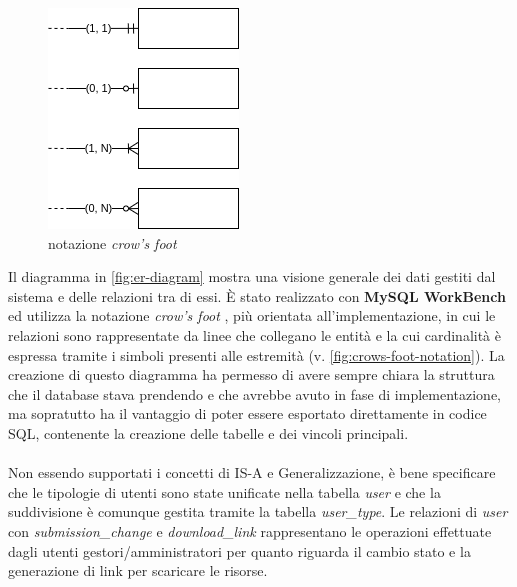 \begin{figure}
	\includegraphics[width=\linewidth]{assets/diagrams/crows-foot-notation.png}
	\cprotect\caption{notazione \textit{crow's foot}}
	\label{fig:crows-foot-notation}
\end{figure}

Il diagramma in \autoref{fig:er-diagram} mostra una visione generale dei dati
gestiti dal sistema e delle relazioni tra di essi. È stato realizzato con \textbf{MySQL WorkBench}
\cite{workbench:9-EER} ed utilizza la notazione \textit{crow's foot} \cite{wiki:crows-foot},
più orientata all'implementazione, in cui le relazioni sono rappresentate da linee
che collegano le entità e la cui cardinalità è espressa tramite i simboli presenti
alle estremità (v. \autoref{fig:crows-foot-notation}). La creazione di questo
diagramma ha permesso di avere sempre chiara la struttura che il database stava
prendendo e che avrebbe avuto in fase di implementazione, ma sopratutto ha il
vantaggio di poter essere esportato direttamente in codice SQL, contenente la
creazione delle tabelle e dei vincoli principali.

\paragraph{}
Non essendo supportati i concetti di IS-A e Generalizzazione, è bene specificare
che le tipologie di utenti sono state unificate nella tabella \textit{user} e che
la suddivisione è comunque gestita tramite la tabella \textit{user\_type}.
Le relazioni di \textit{user} con \textit{submission\_change} e
\textit{download\_link} rappresentano le operazioni effettuate dagli utenti
gestori/amministratori per quanto riguarda il cambio stato e la generazione di
link per scaricare le risorse.


